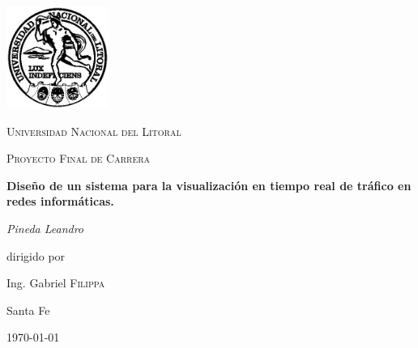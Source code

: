 \documentclass[a4paper,10pt, oneside]{book}
\begin{document}
\begin{titlepage}
	\centering
	\includegraphics[width=0.25\textwidth]{Universidad_del_Litoral}\par\vspace{1cm}
	{\scshape\LARGE Universidad Nacional del Litoral \par}
	\vspace{1cm}
	{\scshape\Large Proyecto Final de Carrera\par}
	\vspace{1.5cm}
	{\huge\bfseries Diseño de un sistema para la visualización en tiempo real de tráfico en redes informáticas.\par}
	\vspace{2cm}
	{\Large\itshape Pineda Leandro\par}
	\vfill
	dirigido por\par
	Ing. Gabriel \textsc{Filippa}

	\vfill
	
	
	
	\large Santa Fe\par
	{\large \today\par}
	
\end{titlepage}

\modulolinenumbers[5]





\newpage
 
\nocite{*}
\printbibliography
\end{document}
